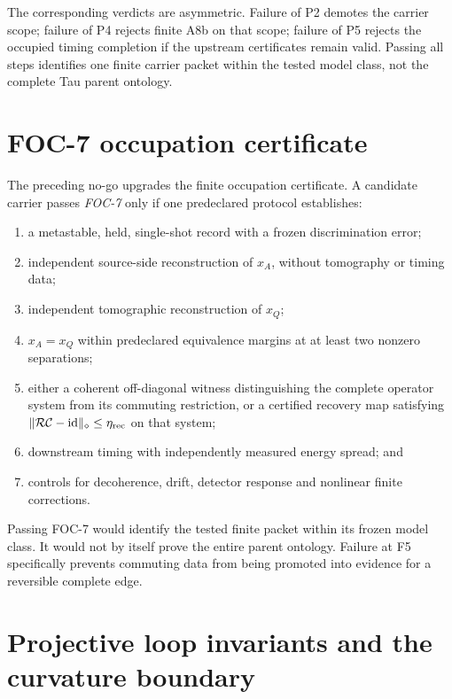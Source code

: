 \documentclass[11pt]{article}
\newcommand{\id}{\operatorname{id}}
\begin{document}
The corresponding verdicts are asymmetric.  Failure of P2 demotes the carrier
scope; failure of P4 rejects finite A8b on that scope; failure of P5 rejects
the occupied timing completion if the upstream certificates remain valid.
Passing all steps identifies one finite carrier packet within the tested model
class, not the complete Tau parent ontology.

\section{FOC-7 occupation certificate}

The preceding no-go upgrades the finite occupation certificate.  A candidate
carrier passes \emph{FOC-7} only if one predeclared protocol establishes:
\begin{enumerate}[label=(F\arabic*)]
 \item a metastable, held, single-shot record with a frozen discrimination
 error;
 \item independent source-side reconstruction of \(x_A\), without tomography
 or timing data;
 \item independent tomographic reconstruction of \(x_Q\);
 \item \(x_A=x_Q\) within predeclared equivalence margins at at least two
 nonzero separations;
 \item either a coherent off-diagonal witness distinguishing the complete
 operator system from its commuting restriction, or a certified recovery map
 satisfying \(\lVert\mathcal R\mathcal C-\id\rVert_\diamond\leq\eta_{\rm rec}\)
 on that system;
 \item downstream timing with independently measured energy spread; and
 \item controls for decoherence, drift, detector response and nonlinear finite
 corrections.
\end{enumerate}
Passing FOC-7 would identify the tested finite packet within its frozen model
class.  It would not by itself prove the entire parent ontology.  Failure at
F5 specifically prevents commuting data from being promoted into evidence for
a reversible complete edge.

\section{Projective loop invariants and the curvature boundary}
\end{document}
